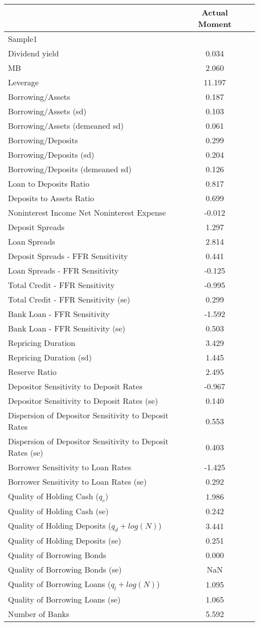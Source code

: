 \begin{tabular*}{\hsize}{@{\hskip\tabcolsep\extracolsep\fill}l*{2}{c}}\hline \hline & \textbf{Actual Moment}  &    \\ [1ex] \hline  Sample1&\\
Dividend yield&0.034&\\
MB&2.060&\\
Leverage&11.197&\\
Borrowing/Assets&0.187&\\
Borrowing/Assets (sd)&0.103&\\
Borrowing/Assets (demeaned sd)&0.061&\\
Borrowing/Deposits&0.299&\\
Borrowing/Deposits (sd)&0.204&\\
Borrowing/Deposits (demeaned sd)&0.126&\\
Loan to Deposits Ratio&0.817&\\
Deposits to Assets Ratio&0.699&\\
Noninterest Income Net Noninterest Expense&-0.012&\\
Deposit Spreads&1.297&\\
Loan Spreads&2.814&\\
Deposit Spreads - FFR Sensitivity&0.441&\\
Loan Spreads - FFR Sensitivity&-0.125&\\
Total Credit - FFR Sensitivity&-0.995&\\
Total Credit - FFR Sensitivity (se)&0.299&\\
Bank Loan - FFR Sensitivity&-1.592&\\
Bank Loan - FFR Sensitivity (se)&0.503&\\
Repricing Duration&3.429&\\
Repricing Duration (sd)&1.445&\\
Reserve Ratio&2.495&\\
Depositor Sensitivity to Deposit Rates&-0.967&\\
Depositor Sensitivity to Deposit Rates (se)&0.140&\\
Dispersion of Depositor Sensitivity to Deposit Rates&0.553&\\
Dispersion of Depositor Sensitivity to Deposit Rates (se)&0.403&\\
Borrower Sensitivity to Loan Rates&-1.425&\\
Borrower Sensitivity to Loan Rates (se)&0.292&\\
Quality of Holding Cash ($q_c$)&1.986&\\
Quality of Holding Cash (se)&0.242&\\
Quality of Holding Deposits ($q_d+log(N)$)&3.441&\\
Quality of Holding Deposits (se)&0.251&\\
Quality of Borrowing Bonds&0.000&\\
Quality of Borrowing Bonds (se)&NaN&\\
Quality of Borrowing Loans ($q_l+log(N)$)&1.095&\\
Quality of Borrowing Loans (se)&1.065&\\
Number of Banks&5.592&\\
\hline \hline \end{tabular*}
